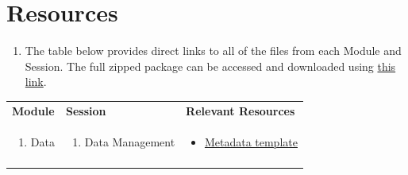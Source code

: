 \documentclass[
]{book}
\providecommand{\tightlist}{%
  \setlength{\itemsep}{0pt}\setlength{\parskip}{0pt}}
\begin{document}
\hypertarget{resources}{%
\section{Resources}\label{resources}}

\begin{enumerate}
\def\labelenumi{\arabic{enumi}.}
\tightlist
\item
  The table below provides direct links to all of the files from each Module and Session. The full zipped package can be accessed and downloaded using \href{files/M5S2_all_resources.zip}{this link}.
\end{enumerate}

\begin{longtable}[]{@{}lll@{}}
\toprule
\endhead
\begin{minipage}[t]{0.15\columnwidth}\raggedright
\textbf{Module}\strut
\end{minipage} & \begin{minipage}[t]{0.34\columnwidth}\raggedright
\textbf{Session}\strut
\end{minipage} & \begin{minipage}[t]{0.42\columnwidth}\raggedright
\textbf{Relevant Resources}\strut
\end{minipage}\tabularnewline
\begin{minipage}[t]{0.15\columnwidth}\raggedright
\begin{enumerate}
\def\labelenumi{\arabic{enumi}.}
\setcounter{enumi}{1}
\tightlist
\item
  Data
\end{enumerate}\strut
\end{minipage} & \begin{minipage}[t]{0.34\columnwidth}\raggedright
\begin{enumerate}
\def\labelenumi{\arabic{enumi}.}
\tightlist
\item
  Data Management
\end{enumerate}\strut
\end{minipage} & \begin{minipage}[t]{0.42\columnwidth}\raggedright
\begin{itemize}
\tightlist
\item
  \href{files/metadata_template_blank.xlsx}{Metadata template}
\end{itemize}\strut
\end{minipage}\tabularnewline
\begin{minipage}[t]{0.15\columnwidth}\raggedright
\strut
\end{minipage} & \begin{minipage}[t]{0.34\columnwidth}\raggedright

\end{minipage}
\end{longtable}
\end{document}
